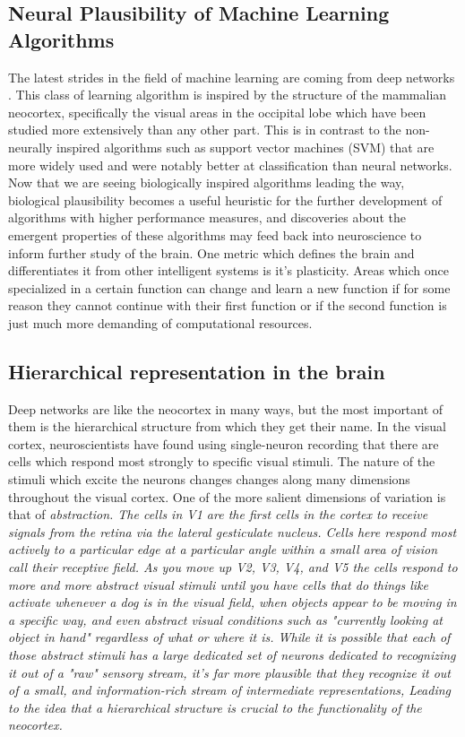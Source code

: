 \documentclass[12pt]{article}
\begin{document}
\begin{doublespacing}
	\subsection{Neural Plausibility of Machine Learning Algorithms}
		The latest strides in the field of machine learning are coming from deep networks \cite{hinton2012deep, lee2009convolutional, grubb2010boosted, tang2012deep, krizhevsky2012imagenet, bengio2009learning}. This class of learning algorithm is inspired by the structure of the mammalian neocortex, specifically the visual areas in the occipital lobe which have been studied more extensively than any other part. This is in contrast to the non-neurally inspired algorithms such as support vector machines  (SVM) that are more widely used and were notably better at classification than neural networks. Now that we are seeing biologically inspired algorithms leading the way, biological plausibility becomes a useful heuristic for the further development of algorithms with higher performance measures, and discoveries about the emergent properties of these algorithms may feed back into neuroscience to inform further study of the brain. 
		One metric which defines the brain and differentiates it from other intelligent systems is it's plasticity. Areas which once specialized in a certain function can change and learn a new function if for some reason they cannot continue with their first function or if the second function is just much more demanding of computational resources. \cite{sharma2000induction}
		
	\subsection{Hierarchical representation in the brain}
		Deep networks are like the neocortex in many ways, but the most important of them is the hierarchical structure from which they get their name. In the visual cortex, neuroscientists have found using single-neuron recording that there are cells which respond most strongly to specific visual stimuli. The nature of the stimuli which excite the neurons changes changes along many dimensions throughout the visual cortex. One of the more salient dimensions of variation is that of \em abstraction\em\cite{hinton2005kind}. The cells in V1 are the first cells in the cortex to receive signals from the retina via the lateral gesticulate nucleus. Cells here respond most actively to a particular edge at a particular angle within a small area of vision call their receptive field. As you move up V2, V3, V4, and V5 the cells respond to more and more abstract visual stimuli until you have cells that do things like activate whenever a dog is in the visual field, when objects appear to be moving in a specific way, and even abstract visual conditions such as "currently looking at object in hand" regardless of what or where it is. While it is possible that each of those abstract stimuli has a large dedicated set of neurons dedicated to recognizing it out of a "raw" sensory stream, it's far more plausible that they recognize it out of a small, and information-rich stream of intermediate representations, Leading to the idea that a hierarchical structure is crucial to the functionality of the neocortex.
		

\end{doublespacing}
\end{document}

